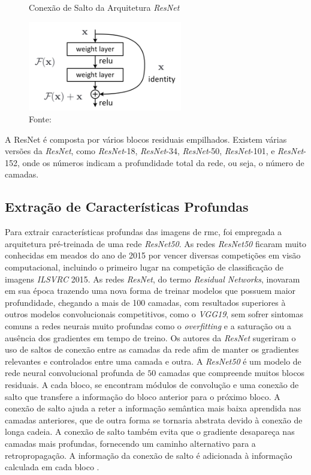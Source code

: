 \begin{figure}[h!]
    \centering
    \captionsetup{width=0.98\textwidth, justification=justified}
    \caption{Conexão de Salto da Arquitetura \textit{ResNet}}
    \includegraphics[width=0.6\textwidth]{figures/fig013.png}
    \caption*{Fonte: \cite{aiSelfAttentionBasedFusion2023}}
    \label{fig:fig013}
\end{figure}

A ResNet é composta por vários blocos residuais empilhados.
Existem várias versões da \textit{ResNet}, como \textit{ResNet}-18, \textit{ResNet}-34, \textit{ResNet}-50, \textit{ResNet}-101, e \textit{ResNet}-152, onde os números indicam a profundidade total da rede, ou seja, o número de camadas.

\subsection{Extração de Características Profundas}
\label{subsec:extract_features}

Para extrair características profundas das imagens de \gls{rmc}, foi empregada a arquitetura pré-treinada de uma rede \textit{ResNet50}. As redes \textit{ResNet50} ficaram muito conhecidas em meados do ano de 2015 por vencer diversas competições em visão computacional, incluindo o primeiro lugar na competição de classificação de imagens \textit{ILSVRC} 2015. As redes \textit{ResNet}, do termo \textit{Residual Networks}, inovaram em sua época trazendo uma nova forma de treinar modelos que possuem maior profundidade, chegando a mais de 100 camadas, com resultados superiores à outros modelos convolucionais competitivos, como o \textit{VGG19}, sem sofrer sintomas comuns a redes neurais muito profundas como o \textit{overfitting} e a saturação ou a ausência dos gradientes em tempo de treino. Os autores da \textit{ResNet} sugeriram o uso de saltos de conexão entre as camadas da rede afim de manter os gradientes relevantes e controlados entre uma camada e outra.  A \textit{ResNet50} é um modelo de rede neural convolucional profunda de $50$ camadas que compreende muitos blocos residuais. A cada bloco, se encontram módulos de convolução e uma conexão de salto que transfere a informação do bloco anterior para o próximo bloco. A conexão de salto ajuda a reter a informação semântica mais baixa aprendida nas camadas anteriores, que de outra forma se tornaria abstrata devido à conexão de longa cadeia. A conexão de salto também evita que o gradiente desapareça nas camadas mais profundas, fornecendo um caminho alternativo para a retropropagação. A informação da conexão de salto é adicionada à informação calculada em cada bloco \cite{heDeepResidualLearning2015}.

